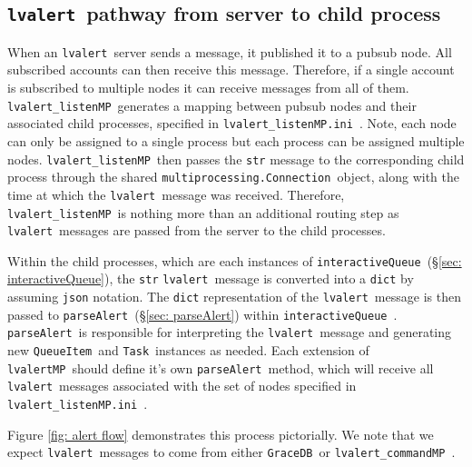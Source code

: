 \documentclass{article}
\newcommand{\multiprocessingConnection}{\texttt{multiprocessing.Connection}~}
\newcommand{\GraceDB}{\texttt{GraceDB}~}
\newcommand{\alert}{\texttt{lvalert}~}
\newcommand{\lvalertMP}{\texttt{lvalertMP}~}
\newcommand{\lvalertListenMP}{\texttt{lvalert\_listenMP}~}
\newcommand{\lvalertCommandMP}{\texttt{lvalert\_commandMP}~}
\newcommand{\interactiveQueue}{\texttt{interactiveQueue}~}
\newcommand{\parseAlert}{\texttt{parseAlert}~}
\newcommand{\QueueItem}{\texttt{QueueItem}~}
\newcommand{\Task}{\texttt{Task}~}
\newcommand{\lvalertMPini}{\texttt{lvalert\_listenMP.ini}~}
\begin{document}

\subsection{\alert pathway from server to child process}
\label{sec: passing alerts}

When an \alert server sends a message, it published it to a pubsub node.
All subscribed accounts can then receive this message.
Therefore, if a single account is subscribed to multiple nodes it can receive messages from all of them.
\lvalertListenMP generates a mapping between pubsub nodes and their associated child processes, specified in \lvalertMPini.
Note, each node can only be assigned to a single process but each process can be assigned multiple nodes.
\lvalertListenMP then passes the \texttt{str} message to the corresponding child process through the shared \multiprocessingConnection object, along with the time at which the \alert message was received.
Therefore, \lvalertListenMP is nothing more than an additional routing step as \alert messages are passed from the server to the child processes.

Within the child processes, which are each instances of \interactiveQueue (\S\ref{sec: interactiveQueue}), the \texttt{str} \alert message is converted into a \texttt{dict} by assuming \texttt{json} notation.
The \texttt{dict} representation of the \alert message is then passed to \parseAlert (\S\ref{sec: parseAlert}) within \interactiveQueue.
\parseAlert is responsible for interpreting the \alert message and generating new \QueueItem and \Task instances as needed.
Each extension of \lvalertMP should define it's own \parseAlert method, which will receive all \alert messages associated with the set of nodes specified in \lvalertMPini. 

Figure \ref{fig: alert flow} demonstrates this process pictorially.
We note that we expect \alert messages to come from either \GraceDB or \lvalertCommandMP.
\end{document}
